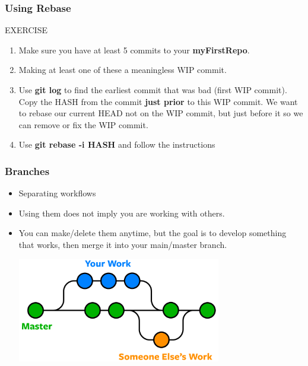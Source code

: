 \documentclass{beamer}
\begin{document}
\begin{frame}[fragile]
	\frametitle{Using Rebase}
	\begin{block}{EXERCISE}
		\begin{enumerate}
			\item Make sure you have at least 5 commits to your \textbf{myFirstRepo}.
			\item Making at least one of these a meaningless WIP commit. 
			\item Use \textbf{git log} to find the earliest commit that was bad (first WIP commit). Copy the HASH from the commit \textbf{just prior} to this WIP commit. We want to rebase our current HEAD not on the WIP commit, but just before it so we can remove or fix the WIP commit. 
			\item Use \textbf{git rebase -i \textlangle{}HASH\textrangle{}} and follow the instructions
		\end{enumerate}
	\end{block}
\end{frame}

\begin{frame}[fragile]
\frametitle{Branches}
\begin{itemize}
	\item Separating workflows
	\item Using them does not imply you are working with others. 
	\item You can make/delete them anytime, but the goal is to develop something that works, then merge it into your main/master branch.
\begin{center}\includegraphics[width=0.7\textwidth]{branch.png}\end{center}
\end{itemize}
\end{frame}
\end{document}
